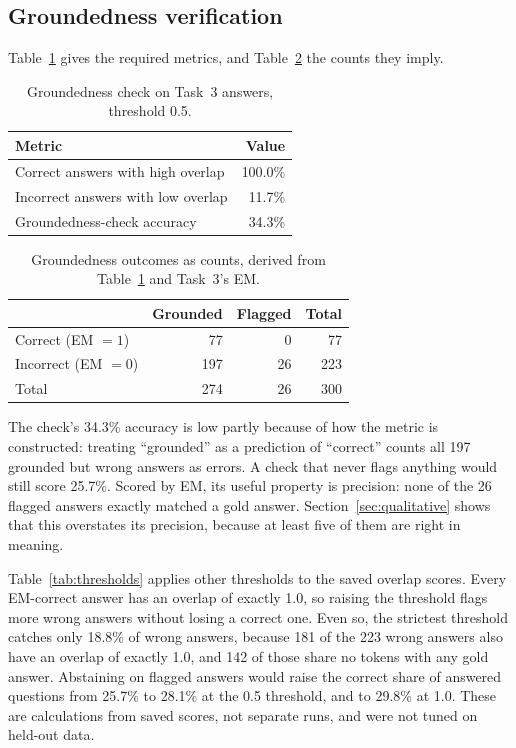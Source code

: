 \documentclass[11pt,a4paper]{article}
\begin{document}
\subsection{Groundedness verification}
\label{sec:ground-results}
Table~\ref{tab:ground} gives the required metrics, and Table~\ref{tab:confusion} the counts they imply.

\begin{table}[ht]
\centering
\begin{tabular}{@{}lr@{}}
\toprule
Metric & Value \\
\midrule
Correct answers with high overlap & 100.0\% \\
Incorrect answers with low overlap & 11.7\% \\
Groundedness-check accuracy & 34.3\% \\
\bottomrule
\end{tabular}
\caption{Groundedness check on Task~3 answers, threshold 0.5.}
\label{tab:ground}
\end{table}

\begin{table}[ht]
\centering
\begin{tabular}{@{}lrrr@{}}
\toprule
 & Grounded & Flagged & Total \\
\midrule
Correct (EM $=1$) & 77 & 0 & 77 \\
Incorrect (EM $=0$) & 197 & 26 & 223 \\
\midrule
Total & 274 & 26 & 300 \\
\bottomrule
\end{tabular}
\caption{Groundedness outcomes as counts, derived from Table~\ref{tab:ground} and Task~3's EM.}
\label{tab:confusion}
\end{table}

The check's 34.3\% accuracy is low partly because of how the metric is constructed: treating ``grounded'' as a prediction of ``correct'' counts all 197 grounded but wrong answers as errors. A check that never flags anything would still score 25.7\%. Scored by EM, its useful property is precision: none of the 26 flagged answers exactly matched a gold answer. Section~\ref{sec:qualitative} shows that this overstates its precision, because at least five of them are right in meaning.

Table~\ref{tab:thresholds} applies other thresholds to the saved overlap scores. Every EM-correct answer has an overlap of exactly 1.0, so raising the threshold flags more wrong answers without losing a correct one. Even so, the strictest threshold catches only 18.8\% of wrong answers, because 181 of the 223 wrong answers also have an overlap of exactly 1.0, and 142 of those share no tokens with any gold answer. Abstaining on flagged answers would raise the correct share of answered questions from 25.7\% to 28.1\% at the 0.5 threshold, and to 29.8\% at 1.0. These are calculations from saved scores, not separate runs, and were not tuned on held-out data.
\end{document}
